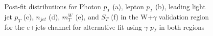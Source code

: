 \begin{figure}[]
\hfil  
{}
\caption{Post-fit distributions for Photon $p_T$ (a), lepton $p_T$ (b), leading light jet $p_T$ (c), $n_{jet}$ (d), $m_T^W$ (e), and $S_T$ (f) in the W+$\gamma$ validation region for the e+jets channel for alternative fit using  $\gamma$ $p_T$ in both regions }
\end{figure}


